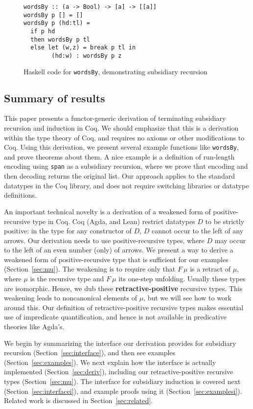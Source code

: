 \documentclass[a4paper,USenglish]{lipics-v2021}
\begin{document}
\begin{figure}
\begin{verbatim}
wordsBy :: (a -> Bool) -> [a] -> [[a]]
wordsBy p [] = []
wordsBy p (hd:tl) =
  if p hd
  then wordsBy p tl 
  else let (w,z) = break p tl in
        (hd:w) : wordsBy p z
\end{verbatim}
\caption{Haskell code for \texttt{wordsBy}, demonstrating subsidiary recursion}
\label{fig:wordsBy}
\end{figure}

\subsection{Summary of results}

This paper presents a functor-generic derivation of terminating
subsidiary recursion and induction in Coq.  We should emphasize that
this is a derivation within the type theory of Coq, and requires no
axioms or other modifications to Coq. Using this derivation, we
present several example functions like \verb|wordsBy|, and prove
theorems about them.  A nice example is a definition of run-length
encoding using \verb|span| as a subsidiary recursion, where we prove
that encoding and then decoding returns the original list.  Our
approach applies to the standard datatypes in the Coq library, and
does not require switching libraries or datatype definitions.

An important technical novelty is a derivation of a weakened form of
positive-recursive type in Coq.  Coq (Agda, and Lean) restrict
datatypes $D$ to be strictly positive: in the type for any constructor
of $D$, $D$ cannot occur to the left of any arrows.  Our derivation
needs to use positive-recursive types, where $D$ may occur to the left
of an even number (only) of arrows.  We present a way to derive a
weakened form of positive-recursive type that is sufficient for our
examples (Section~\ref{sec:mu}).  The weakening is to require only
that $F\ \mu$ is a retract of $\mu$, where $\mu$ is the recursive type
and $F\ \mu$ its one-step unfolding.  Usually these types are
isomorphic.  Hence, we dub these \textbf{retractive-positive}
recursive types.  This weakening leads to noncanonical elements of
$\mu$, but we will see how to work around this.  Our definition of
retractive-positive recursive types makes essential use of impredicate
quantification, and hence is not available in predicative theories
like Agda's.

We begin by summarizing the interface our derivation provides for
subsidiary recursion (Section~\ref{sec:interface}), and then see
examples (Section~\ref{sec:examples}).  We next explain how the
interface is actually implemented (Section~\ref{sec:deriv}), including
our retractive-positive recursive types (Section~\ref{sec:mu}).  The
interface for subsidiary induction is covered next
(Section~\ref{sec:interfacei}), and example proofs using it
(Section~\ref{sec:examplesi}).  Related work is discussed in
Section~\ref{sec:related}.
\end{document}
